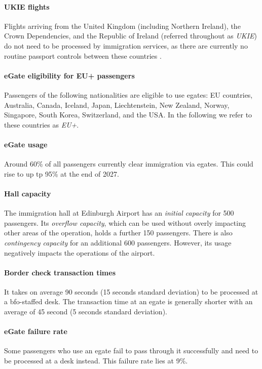 \documentclass[10pt]{article}
\begin{document}
\paragraph{UKIE flights} Flights arriving from the United Kingdom (including Northern Ireland), the Crown Dependencies, and the Republic of Ireland (referred throughout as \textit{UKIE}) do not need to be processed by immigration services, as there are currently no routine passport controls between these countries \cite{common_travel_area}.

\paragraph{eGate eligibility for EU+ passengers}
Passengers of the following nationalities are eligible to use \glspl{egate}: EU countries, Australia, Canada, Iceland, Japan, Liechtenstein, New Zealand, Norway, Singapore, South Korea, Switzerland, and the USA. In the following we refer to these countries as \textit{EU+}. 

\paragraph{eGate usage}
Around 60\% of all passengers currently clear immigration via \glspl{egate}. This could rise to up tp 95\% at the end of 2027.

\paragraph{Hall capacity}
The immigration hall at Edinburgh Airport has an \textit{initial capacity} for 500 passengers. Its \textit{overflow capacity}, which can be used without overly impacting other areas of the operation, holds a further 150 passengers. There is also \textit{contingency capacity} for an additional 600 passengers. However, its usage negatively impacts the operations of the airport.

\paragraph{Border check transaction times} It takes on average 90 seconds (15 seconds standard deviation) to be processed at a \gls{bfo}-staffed desk. The transaction time at an \gls{egate} is generally shorter with an average of 45 second (5 seconds standard deviation). 

\paragraph{eGate failure rate}
Some passengers who use an \gls{egate} fail to pass through it successfully and need to be processed at a desk instead. This failure rate lies at 9\%.
\end{document}
